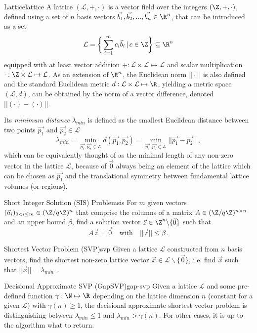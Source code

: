 \newcommand{\lat}{\mathcal{L}}
\begin{definition}{Lattice}{lattice}
  A lattice $(\lat, +, \cdot)$ is a vector field over the integers $(\Z, +, \cdot)$, defined using a set of $n$
  basis vectors $\vec{b_1}, \vec{b_2}, ..., \vec{b_n} \in \R^n$, that can be introduced as a set
  $$\lat = \bigg\{\sum_{i=1}^m c_i \vec{b}_i \,|\, c \in \Z\bigg\} \subseteq \R^n$$
  equipped with at least vector addition $+: \lat \times \lat \mapsto \lat$
  and scalar multiplication $\cdot: \Z \times \lat \mapsto \lat$.
  As an extension of $\R^n$, the Euclidean norm $||\cdot||$ is also defined and
  the standard Euclidean metric $d: \lat \times \lat \mapsto \R$, yielding a metric space $(\lat, d)$,
  can be obtained by the norm of a vector difference, denoted $||(\cdot) - (\cdot)||$.
\end{definition}

Its \textit{minimum distance} $\lambda_{min}$ is defined as the smallest Euclidean distance
between two points $\vec{p_1}$ and $\vec{p_2} \in \lat$
$$\lambda_{min} = \min_{\vec{p_1}, \vec{p_2} \in \lat} d(\vec{p_1}, \vec{p_2}) =
  \min_{\vec{p_1}, \vec{p_2} \in \lat} ||\vec{p_1} - \vec{p_2}|| \,,$$
which can be equivalently thought of as the minimal length of any non-zero vector in the lattice $\lat$,
because of $\vec{0}$ always being an element of the lattice which can be chosen as $\vec{p_1}$
and the translational symmetry between fundamental lattice volumes (or regions).

\begin{definition}{Short Integer Solution (SIS) Problem}{sis}
  For $m$ given vectors $(\vec{a}_i)_{0 < i \leq m} \in (\Z / q\Z)^n$ that comprise the columns of a matrix
  $A \in (\Z / q\Z)^{n \times n}$ and an upper bound $\beta$, find
  a solution vector $\vec{z} \in \Z^n \backslash \{\vec{0}\}$ such that
  $$A \vec{z} = \vec{0} \quad \mathrm{with} \quad ||\vec{z}|| \leq \beta\,.$$
\end{definition}

\begin{definition}{Shortest Vector Problem (SVP)}{svp}
  Given a lattice $\lat$ constructed from $n$ basis vectors,
  find the shortest non-zero lattice vector $\vec{x} \in \lat \backslash \{\vec{0}\}$,
  i.e. find $\vec{x}$ such that $||\vec{x}|| = \lambda_{min}$ \parencite{2016-decade-of-lattice}.
\end{definition}

\begin{definition}{Decisional Approximate SVP (GapSVP)}{gap-svp}
  Given a lattice $\lat$ and some pre-defined function $\gamma: \N \mapsto \R$ depending
  on the lattice dimension $n$ (constant for a given $\lat$) with $\gamma(n) \geq 1$,
  the decisional approximate shortest vector problem is distinguishing
  between $\lambda_{min} \leq 1$ and $\lambda_{min} > \gamma(n)$.
  For other cases, it is up to the algorithm what to return.
\end{definition}

